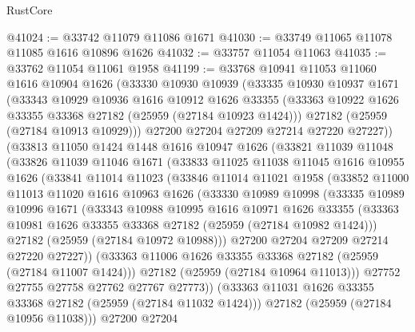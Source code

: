 \begin{lexlean}{RustCore}
\begin{coremodule}
@41024 := @33742 @11079 @11086 @1671
@41030 := @33749 @11065 @11078 @11085 @1616 @10896 @1626
@41032 := @33757 @11054 @11063
@41035 := @33762 @11054 @11061 @1958
@41199 := @33768
    @10941
    @11053
    @11060
    @1616
    @10904
    @1626
    (@33330
      @10930
      @10939
      (@33335
        @10930
        @10937
        @1671
        (@33343
          @10929
          @10936
          @1616
          @10912
          @1626
          @33355
          (@33363 @10922 @1626 @33355 @33368 @27182 (@25959 (@27184 @10923 @1424)))
          @27182
          (@25959 (@27184 @10913 @10929)))
        @27200
        @27204
        @27209
        @27214
        @27220
        @27227))
    (@33813
      @11050
      @1424
      @1448
      @1616
      @10947
      @1626
      (@33821
        @11039
        @11048
        (@33826
          @11039
          @11046
          @1671
          (@33833
            @11025
            @11038
            @11045
            @1616
            @10955
            @1626
            (@33841
              @11014
              @11023
              (@33846
                @11014
                @11021
                @1958
                (@33852
                  @11000
                  @11013
                  @11020
                  @1616
                  @10963
                  @1626
                  (@33330
                    @10989
                    @10998
                    (@33335
                      @10989
                      @10996
                      @1671
                      (@33343
                        @10988
                        @10995
                        @1616
                        @10971
                        @1626
                        @33355
                        (@33363 @10981 @1626 @33355 @33368 @27182 (@25959 (@27184 @10982 @1424)))
                        @27182
                        (@25959 (@27184 @10972 @10988)))
                      @27200
                      @27204
                      @27209
                      @27214
                      @27220
                      @27227))
                  (@33363 @11006 @1626 @33355 @33368 @27182 (@25959 (@27184 @11007 @1424)))
                  @27182
                  (@25959 (@27184 @10964 @11013)))
                @27752
                @27755
                @27758
                @27762
                @27767
                @27773))
            (@33363 @11031 @1626 @33355 @33368 @27182 (@25959 (@27184 @11032 @1424)))
            @27182
            (@25959 (@27184 @10956 @11038)))
          @27200
          @27204

\end{coremodule}
\end{lexlean}
